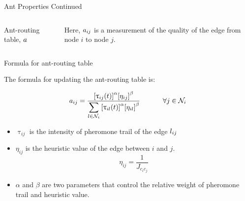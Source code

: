 \documentclass[table]{beamer}
\begin{document}
\begin{frame}{Ant Properties Continued}	
	\begin{columns}
		
		\begin{column}{0.6\textwidth}
		
		\centering
		\vspace{\baselineskip}
		\Large Ant-routing table, $ \mathnormal{a} $
		\end{column}
		\begin{column}{0.4\textwidth}
			\centering
			Here, $ \mathnormal{a_{ij}} $ is a measurement of the quality of the edge from node $i$ to node $j$.
		\end{column}
	\end{columns}
\end{frame}

\begin{frame}{Formula for ant-routing table}

	The formula for updating the ant-routing table is:
	
	{\Large $$
		\Large a_{ij} = \frac { {[\uptau_{ij}(t)]}^{\alpha} {[\eta_{ij}]}^{\beta} }
		{\displaystyle\sum_{l \in \mathcal{N}_i} {[\uptau_{il}(t)]}^{\alpha} {[\eta_{il}]}^{\beta} } 
		\ \ \ \ \ \ \ \forall j \in \mathcal{N}_i
		$$}
	
	\begin{itemize}
		\item  $ {\uptau_{ij}} $ is the intensity of pheromone trail of the  edge $ 	\mathnormal{l_{ij}} $
		
		\item $ {\eta_{ij}} $ is the heuristic value of the edge between $i$ and $j$.	
		{\Large $$ {\eta_{ij}} = \frac{1}{J_{c_ic_j}} $$ }
		
		\item $\alpha$ and $\beta$ are two parameters that control the relative weight of pheromone trail and heuristic value. 
	\end{itemize}
	
\end{frame}
\end{document}
